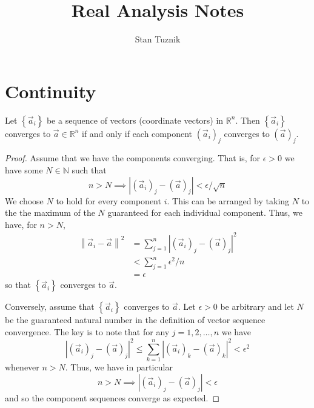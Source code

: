 
\title{Real Analysis Notes}
\author{Stan Tuznik}




\maketitle
\tableofcontents


\chapter{Continuity}



\begin{prop}
Let $ \left\{ \vec{a}_i \right\} $ be a sequence of vectors (coordinate vectors) in $\mathbb{R}^n$. Then $\left\{ \vec{a}_i\right\}$ converges to $\vec{a} \in \mathbb{R}^n$ if and only if each component $\left(\vec{a}_i\right)_j$ converges to $\left(\vec{a}\right)_j$.
\end{prop}
\begin{proof}
Assume that we have the components converging. That is, for $\epsilon >0$ we have some $N \in \mathbb{N}$ such that  \[ n > N \implies \left| \left(\vec{a}_i\right)_j - \left(\vec{a}\right)_j \right| < \epsilon  / \sqrt{n} \]
We choose $N$ to hold for every component $i$. This can be arranged by taking $N$ to the the maximum of the $N$ guaranteed for each individual component. Thus, we have, for $n>N$,
\begin{align*}
	\left\lVert \vec{a}_i - \vec{a} \right\rVert^2 & = \sum_{j=1}^n \left\lvert  \left(\vec{a}_i\right)_j - \left(\vec{a}\right)_j \right\rvert^2 \\
	& < \sum_{j=1}^n \epsilon^2 / n \\
	& = \epsilon
\end{align*}
so that $\left\{ \vec{a}_i \right\}$ converges to $\vec{a}$. 

Conversely, assume that $\left\{ \vec{a}_i \right\}$ converges to $\vec{a}$. Let $\epsilon > 0 $ be arbitrary and let $N$ be the guaranteed natural number in the definition of vector sequence convergence. The key is to note that for any $j = 1,2,\ldots, n$ we have \[ \left\lvert \left(\vec{a}_i\right)_j - \left(\vec{a}\right)_j \right\rvert^2 \leq \sum_{k=1}^n \left\lvert \left(\vec{a}_i\right)_k - \left(\vec{a}\right)_k \right\rvert^2 < \epsilon^2 \] whenever $n>N$. Thus, we have in particular \[ n>N \implies \left\lvert \left(\vec{a}_i\right)_j - \left(\vec{a}\right)_j \right\rvert < \epsilon \] and so the component sequences converge as expected.
\end{proof}








